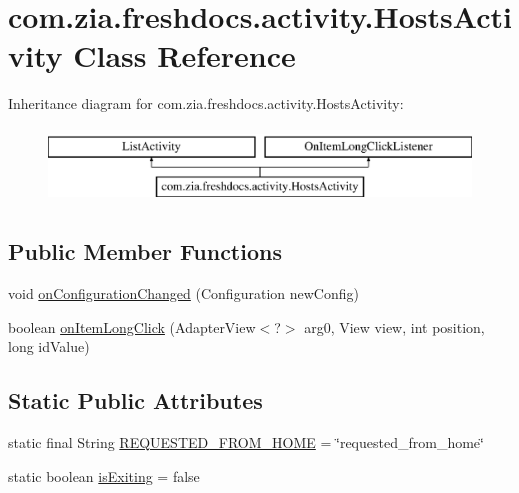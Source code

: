 \hypertarget{classcom_1_1zia_1_1freshdocs_1_1activity_1_1_hosts_activity}{\section{com.\-zia.\-freshdocs.\-activity.\-Hosts\-Activity Class Reference}
\label{classcom_1_1zia_1_1freshdocs_1_1activity_1_1_hosts_activity}
}
Inheritance diagram for com.\-zia.\-freshdocs.\-activity.\-Hosts\-Activity\-:\begin{figure}[H]
\begin{center}
\leavevmode
\includegraphics[height=2.000000cm]{classcom_1_1zia_1_1freshdocs_1_1activity_1_1_hosts_activity}
\end{center}
\end{figure}
\subsection*{Public Member Functions}
\begin{DoxyCompactItemize}
\item 
void \hyperlink{classcom_1_1zia_1_1freshdocs_1_1activity_1_1_hosts_activity_a419037933a992d5bc0581e5a97d5ac83}{on\-Configuration\-Changed} (Configuration new\-Config)
\item 
boolean \hyperlink{classcom_1_1zia_1_1freshdocs_1_1activity_1_1_hosts_activity_a580d06dd1fc39087e7a08df04c768da6}{on\-Item\-Long\-Click} (Adapter\-View$<$?$>$ arg0, View view, int position, long id\-Value)
\end{DoxyCompactItemize}
\subsection*{Static Public Attributes}
\begin{DoxyCompactItemize}
\item 
static final String \hyperlink{classcom_1_1zia_1_1freshdocs_1_1activity_1_1_hosts_activity_a226c914fe5e983ad39ca6c182b5fc0e1}{R\-E\-Q\-U\-E\-S\-T\-E\-D\-\_\-\-F\-R\-O\-M\-\_\-\-H\-O\-M\-E} = \char`\"{}requested\-\_\-from\-\_\-home\char`\"{}
\item 
static boolean \hyperlink{classcom_1_1zia_1_1freshdocs_1_1activity_1_1_hosts_activity_a245aec4556ef1ef381fc5106e1d3034e}{is\-Exiting} = false
\end{DoxyCompactItemize}
